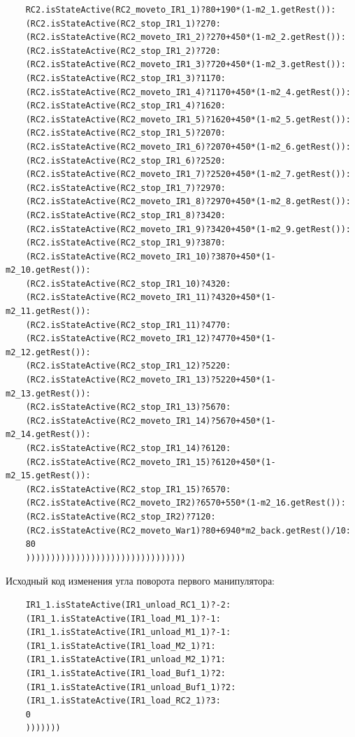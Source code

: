 \begin{verbatim}
    RC2.isStateActive(RC2_moveto_IR1_1)?80+190*(1-m2_1.getRest()):
    (RC2.isStateActive(RC2_stop_IR1_1)?270:
    (RC2.isStateActive(RC2_moveto_IR1_2)?270+450*(1-m2_2.getRest()):
    (RC2.isStateActive(RC2_stop_IR1_2)?720:
    (RC2.isStateActive(RC2_moveto_IR1_3)?720+450*(1-m2_3.getRest()):
    (RC2.isStateActive(RC2_stop_IR1_3)?1170:
    (RC2.isStateActive(RC2_moveto_IR1_4)?1170+450*(1-m2_4.getRest()):
    (RC2.isStateActive(RC2_stop_IR1_4)?1620:
    (RC2.isStateActive(RC2_moveto_IR1_5)?1620+450*(1-m2_5.getRest()):
    (RC2.isStateActive(RC2_stop_IR1_5)?2070:
    (RC2.isStateActive(RC2_moveto_IR1_6)?2070+450*(1-m2_6.getRest()):
    (RC2.isStateActive(RC2_stop_IR1_6)?2520:
    (RC2.isStateActive(RC2_moveto_IR1_7)?2520+450*(1-m2_7.getRest()):
    (RC2.isStateActive(RC2_stop_IR1_7)?2970:
    (RC2.isStateActive(RC2_moveto_IR1_8)?2970+450*(1-m2_8.getRest()):
    (RC2.isStateActive(RC2_stop_IR1_8)?3420:
    (RC2.isStateActive(RC2_moveto_IR1_9)?3420+450*(1-m2_9.getRest()):
    (RC2.isStateActive(RC2_stop_IR1_9)?3870:
    (RC2.isStateActive(RC2_moveto_IR1_10)?3870+450*(1-m2_10.getRest()):
    (RC2.isStateActive(RC2_stop_IR1_10)?4320:
    (RC2.isStateActive(RC2_moveto_IR1_11)?4320+450*(1-m2_11.getRest()):
    (RC2.isStateActive(RC2_stop_IR1_11)?4770:
    (RC2.isStateActive(RC2_moveto_IR1_12)?4770+450*(1-m2_12.getRest()):
    (RC2.isStateActive(RC2_stop_IR1_12)?5220:
    (RC2.isStateActive(RC2_moveto_IR1_13)?5220+450*(1-m2_13.getRest()):
    (RC2.isStateActive(RC2_stop_IR1_13)?5670:
    (RC2.isStateActive(RC2_moveto_IR1_14)?5670+450*(1-m2_14.getRest()):
    (RC2.isStateActive(RC2_stop_IR1_14)?6120:
    (RC2.isStateActive(RC2_moveto_IR1_15)?6120+450*(1-m2_15.getRest()):
    (RC2.isStateActive(RC2_stop_IR1_15)?6570:
    (RC2.isStateActive(RC2_moveto_IR2)?6570+550*(1-m2_16.getRest()):
    (RC2.isStateActive(RC2_stop_IR2)?7120:
    (RC2.isStateActive(RC2_moveto_War1)?80+6940*m2_back.getRest()/10:
    80
    ))))))))))))))))))))))))))))))))
\end{verbatim}

Исходный код изменения угла поворота первого манипулятора:

\begin{verbatim}
    IR1_1.isStateActive(IR1_unload_RC1_1)?-2:
    (IR1_1.isStateActive(IR1_load_M1_1)?-1:
    (IR1_1.isStateActive(IR1_unload_M1_1)?-1:
    (IR1_1.isStateActive(IR1_load_M2_1)?1:
    (IR1_1.isStateActive(IR1_unload_M2_1)?1:
    (IR1_1.isStateActive(IR1_load_Buf1_1)?2:
    (IR1_1.isStateActive(IR1_unload_Buf1_1)?2:
    (IR1_1.isStateActive(IR1_load_RC2_1)?3:
    0
    )))))))
\end{verbatim}

